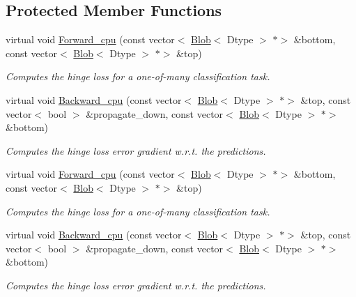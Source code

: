 \subsection*{Protected Member Functions}
\begin{DoxyCompactItemize}
\item 
virtual void \mbox{\hyperlink{classcaffe_1_1_hinge_loss_layer_ab10e623d1ffbef7ba7ceeaf225bca428}{Forward\+\_\+cpu}} (const vector$<$ \mbox{\hyperlink{classcaffe_1_1_blob}{Blob}}$<$ Dtype $>$ $\ast$$>$ \&bottom, const vector$<$ \mbox{\hyperlink{classcaffe_1_1_blob}{Blob}}$<$ Dtype $>$ $\ast$$>$ \&top)
\begin{DoxyCompactList}\small\item\em Computes the hinge loss for a one-\/of-\/many classification task. \end{DoxyCompactList}\item 
virtual void \mbox{\hyperlink{classcaffe_1_1_hinge_loss_layer_a4eb93cbad1070ce4e6e4de8fa1eb01ab}{Backward\+\_\+cpu}} (const vector$<$ \mbox{\hyperlink{classcaffe_1_1_blob}{Blob}}$<$ Dtype $>$ $\ast$$>$ \&top, const vector$<$ bool $>$ \&propagate\+\_\+down, const vector$<$ \mbox{\hyperlink{classcaffe_1_1_blob}{Blob}}$<$ Dtype $>$ $\ast$$>$ \&bottom)
\begin{DoxyCompactList}\small\item\em Computes the hinge loss error gradient w.\+r.\+t. the predictions. \end{DoxyCompactList}\item 
virtual void \mbox{\hyperlink{classcaffe_1_1_hinge_loss_layer_a8e8e160c36e0f3d1f1ab60e623506ec1}{Forward\+\_\+cpu}} (const vector$<$ \mbox{\hyperlink{classcaffe_1_1_blob}{Blob}}$<$ Dtype $>$ $\ast$$>$ \&bottom, const vector$<$ \mbox{\hyperlink{classcaffe_1_1_blob}{Blob}}$<$ Dtype $>$ $\ast$$>$ \&top)
\begin{DoxyCompactList}\small\item\em Computes the hinge loss for a one-\/of-\/many classification task. \end{DoxyCompactList}\item 
virtual void \mbox{\hyperlink{classcaffe_1_1_hinge_loss_layer_a1e16888f22c7ace492343a96b1f48eb8}{Backward\+\_\+cpu}} (const vector$<$ \mbox{\hyperlink{classcaffe_1_1_blob}{Blob}}$<$ Dtype $>$ $\ast$$>$ \&top, const vector$<$ bool $>$ \&propagate\+\_\+down, const vector$<$ \mbox{\hyperlink{classcaffe_1_1_blob}{Blob}}$<$ Dtype $>$ $\ast$$>$ \&bottom)
\begin{DoxyCompactList}\small\item\em Computes the hinge loss error gradient w.\+r.\+t. the predictions. \end{DoxyCompactList}\end{DoxyCompactItemize}
